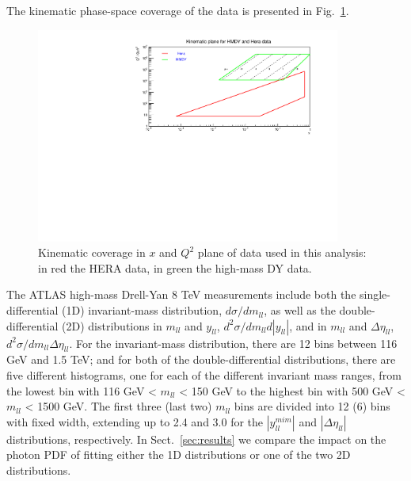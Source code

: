 The kinematic phase-space coverage of the data is presented in Fig.~\ref{fig:data}.
\begin{figure}[t]
  \begin{center}
    \includegraphics[width=10cm]{figs/kin2.pdf}
    \end{center}
    \caption{Kinematic coverage in $x$ and $Q^2$ plane of data used in this analysis: in red the HERA data, in green the high-mass DY data.}
\label{fig:data}
\end{figure}
The ATLAS high-mass Drell-Yan 8 TeV measurements include both the
single-differential (1D) invariant-mass distribution,
$d\sigma/dm_{ll}$, as well as the double-differential (2D)
distributions in $m_{ll}$ and $y_{ll}$,
$d^{2}\sigma/dm_{ll}d|y_{ll}|$, and in $m_{ll}$ and $\Delta\eta_{ll}$,
$d^{2}\sigma/dm_{ll}\Delta\eta_{ll}$.
%
For the invariant-mass distribution, there are 12 bins between 116 GeV
and 1.5 TeV; and for both of the double-differential distributions,
there are five different histograms, one for each of the different
invariant mass ranges, from the lowest bin with 116 GeV < $m_{ll}$ <
150 GeV to the highest bin with 500 GeV < $m_{ll}$ < 1500 GeV.
The first three (last two) $m_{ll}$ bins are divided into 12 (6) bins
with fixed width, extending up to 2.4 and 3.0 for the $|y_{ll}^{mim}|$
and $|\Delta\eta_{ll}|$ distributions, respectively.
%
In Sect.~\ref{sec:results} we compare the impact on the photon PDF of
fitting either the 1D distributions or one of the two 2D
distributions.

